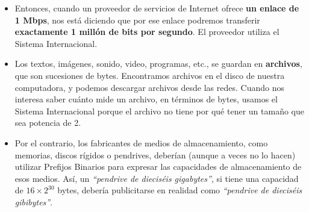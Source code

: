 \documentclass[spanish,a4paper,]{article}
\providecommand{\tightlist}{%
  \setlength{\itemsep}{0pt}\setlength{\parskip}{0pt}}
\begin{document}
\begin{itemize}
\tightlist
\item
  Entonces, cuando un proveedor de servicios de Internet ofrece
  \textbf{un enlace de 1 Mbps}, nos está diciendo que por ese enlace
  podremos transferir \textbf{exactamente 1 millón de bits por segundo}.
  El proveedor utiliza el Sistema Internacional.
\item
  Los textos, imágenes, sonido, video, programas, etc., se guardan en
  \textbf{archivos}, que son sucesiones de bytes. Encontramos archivos
  en el disco de nuestra computadora, y podemos descargar archivos desde
  las redes. Cuando nos interesa saber cuánto mide un archivo, en
  términos de bytes, usamos el Sistema Internacional porque el archivo
  no tiene por qué tener un tamaño que sea potencia de 2.
\item
  Por el contrario, los fabricantes de medios de almacenamiento, como
  memorias, discos rígidos o pendrives, deberían (aunque a veces no lo
  hacen) utilizar Prefijos Binarios para expresar las capacidades de
  almacenamiento de esos medios. Así, un \emph{``pendrive de dieciséis
  gigabytes''}, si tiene una capacidad de \(16 \times 2^{30}\) bytes,
  debería publicitarse en realidad como \emph{``pendrive de dieciséis
  gibibytes''}.
\end{itemize}
\end{document}
